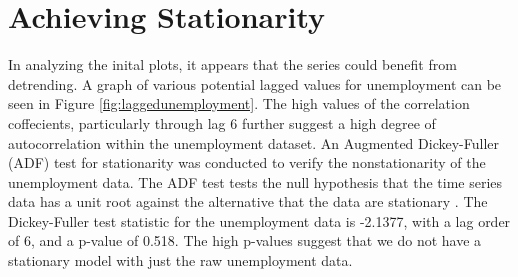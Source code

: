 \documentclass[twoside,twocolumn]{article}
\begin{document}

\section{Achieving Stationarity}

In analyzing the inital plots, it appears that the series could benefit from detrending. A graph of various potential lagged values for unemployment can be seen in Figure \ref{fig:laggedunemployment}. The high values of the correlation coffecients, particularly through lag 6 further suggest a high degree of autocorrelation within the unemployment dataset.    An Augmented Dickey-Fuller (ADF) test for stationarity was conducted to verify the nonstationarity of the unemployment data.  The ADF test tests the null hypothesis that the time series data has a unit root against the alternative that the data are stationary \citep{Shumway2006}. The Dickey-Fuller test statistic for the unemployment data is -2.1377, with a lag order of 6, and a p-value of 0.518. The high p-values suggest that we do not have a stationary model with just the raw unemployment data.
			
\end{document}
